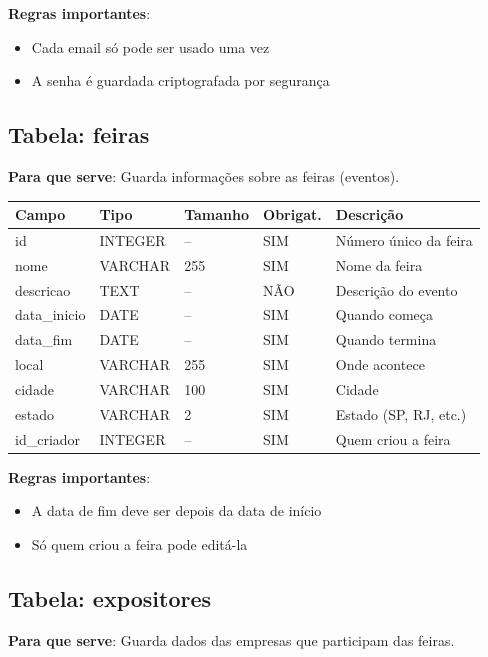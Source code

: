 \documentclass[12pt,a4paper]{article}
\begin{document}
\textbf{Regras importantes}:
\begin{itemize}
    \item Cada email só pode ser usado uma vez
    \item A senha é guardada criptografada por segurança
\end{itemize}

\subsection{Tabela: feiras}

\textbf{Para que serve}: Guarda informações sobre as feiras (eventos).

\begin{longtable}{|p{3cm}|p{2cm}|p{2cm}|p{1.5cm}|p{5cm}|}
\hline
\textbf{Campo} & \textbf{Tipo} & \textbf{Tamanho} & \textbf{Obrigat.} & \textbf{Descrição} \\
\hline
\endhead
id & INTEGER & -- & SIM & Número único da feira \\
\hline
nome & VARCHAR & 255 & SIM & Nome da feira \\
\hline
descricao & TEXT & -- & NÃO & Descrição do evento \\
\hline
data\_inicio & DATE & -- & SIM & Quando começa \\
\hline
data\_fim & DATE & -- & SIM & Quando termina \\
\hline
local & VARCHAR & 255 & SIM & Onde acontece \\
\hline
cidade & VARCHAR & 100 & SIM & Cidade \\
\hline
estado & VARCHAR & 2 & SIM & Estado (SP, RJ, etc.) \\
\hline
id\_criador & INTEGER & -- & SIM & Quem criou a feira \\
\hline
\end{longtable}

\textbf{Regras importantes}:
\begin{itemize}
    \item A data de fim deve ser depois da data de início
    \item Só quem criou a feira pode editá-la
\end{itemize}

\subsection{Tabela: expositores}

\textbf{Para que serve}: Guarda dados das empresas que participam das feiras.
\end{document}
